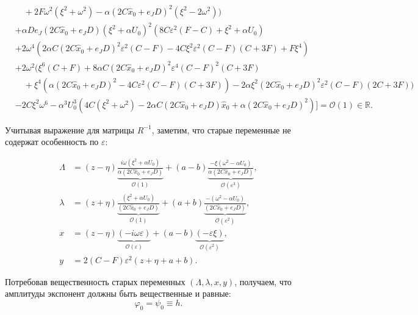 \begin{equation*}
\begin{split}
&\quad +2 F \omega ^2 \left(\xi ^2+\omega ^2\right)-\alpha (2C \hat x_0 + e_J D)^2 \left(\xi ^2-2 \omega ^2\right)\bigg) \\
&+\alpha D e_J (2C \hat x_0 + e_J D) \left(\xi ^2+\alpha U_0\right)^2 \left(8 C \varepsilon ^2 (F-C)+\xi ^2+\alpha U_0\right) \\
&+2 \omega ^4 \left(2 \alpha C (2C \hat x_0 + e_J D)^2 \varepsilon ^2 (C-F)-4 C \xi ^2 \varepsilon ^2 (C-F) (C+3 F)+F \xi ^4\right) \\
&+2 \omega ^2 \bigg(\xi ^6 (C+F)+8 \alpha C (2C \hat x_0 + e_J D)^2 \varepsilon ^4 (C-F)^2 (C+3 F) \\
&\quad +\xi ^4 \left(\alpha (2C \hat x_0 + e_J D)^2-4 C \varepsilon ^2 (C-F) (C+3 F)\right)-2 \alpha \xi ^2 (2C \hat x_0 + e_J D)^2 \varepsilon ^2 (C-F) (2 C+3 F)\bigg) \\
&-2 C \xi ^2 \omega ^6-\alpha ^3 U_0^3 \left(4 C \left(\xi ^2+\omega ^2\right)-2 \alpha C (2C \hat x_0 + e_J D) \hat x_0+\alpha (2C \hat x_0 + e_J D)^2\right)
\Bigg] = \mathcal{O}(1)  \in \mathbb{R}.
\end{split}
\end{equation*}

Учитывая выражение для матрицы $R^{-1}$, заметим, что старые переменные не содержат особенность по $\varepsilon$:

\begin{equation*}
\begin{aligned}
\Lambda &= (z-\eta)\underbrace{\frac{i\omega(\xi^2+\alpha U_0)}{\alpha (2C \hat x_0 + e_J D)}}_{\mathcal{O}(1)} + (a-b) \underbrace{\frac{-\xi(\omega^2-\alpha U_0)}{\alpha (2C \hat x_0 + e_J D)}}_{\mathcal{O}(\varepsilon^3)},\\
\lambda &= (z+\eta)\underbrace{\frac{(\xi^2+\alpha U_0)}{(2C \hat x_0 + e_J D)}}_{\mathcal{O}(1)} + (a+b) \underbrace{\frac{-(\omega^2-\alpha U_0)}{(2C \hat x_0 + e_J D)}}_{\mathcal{O}(\varepsilon^2)},\\
x &= (z-\eta)\underbrace{(-i\omega\varepsilon)}_{\mathcal{O}(\varepsilon)}+(a-b) \underbrace{(-\varepsilon \xi)}_{\mathcal{O}(\varepsilon^2)},\\
y &= 2(C-F)\varepsilon^2 (z+\eta+a+b).
\end{aligned}
\label{old_var}
\end{equation*}

Потребовав вещественность старых переменных $(\Lambda,\lambda,x,y)$, получаем, что амплитуды экспонент должны быть вещественные и равные:
$$\varphi_0 = \psi_0 \equiv h.$$

